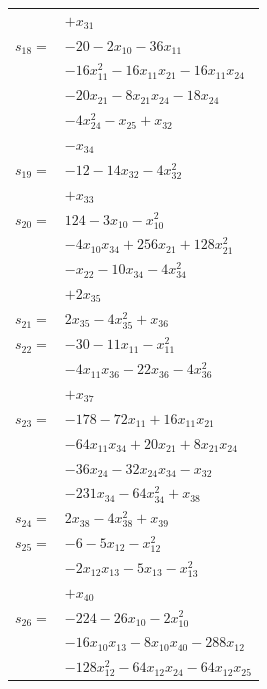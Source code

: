 \begin{longtable}{@{}r@{\;}l@{}}
 & \(\displaystyle +x_{31}\) \\[3pt]
\(s_{18}=\) & \(\displaystyle -20 -2x_{10} -36x_{11}\) \\
 & \(\displaystyle -16x_{11}^{2} -16x_{11}x_{21} -16x_{11}x_{24}\) \\
 & \(\displaystyle -20x_{21} -8x_{21}x_{24} -18x_{24}\) \\
 & \(\displaystyle -4x_{24}^{2} -x_{25} +x_{32}\) \\
 & \(\displaystyle -x_{34}\) \\[3pt]
\(s_{19}=\) & \(\displaystyle -12 -14x_{32} -4x_{32}^{2}\) \\
 & \(\displaystyle +x_{33}\) \\[3pt]
\(s_{20}=\) & \(\displaystyle 124 -3x_{10} -x_{10}^{2}\) \\
 & \(\displaystyle -4x_{10}x_{34} +256x_{21} +128x_{21}^{2}\) \\
 & \(\displaystyle -x_{22} -10x_{34} -4x_{34}^{2}\) \\
 & \(\displaystyle +2x_{35}\) \\[3pt]
\(s_{21}=\) & \(\displaystyle 2x_{35} -4x_{35}^{2} +x_{36}\) \\[3pt]
\(s_{22}=\) & \(\displaystyle -30 -11x_{11} -x_{11}^{2}\) \\
 & \(\displaystyle -4x_{11}x_{36} -22x_{36} -4x_{36}^{2}\) \\
 & \(\displaystyle +x_{37}\) \\[3pt]
\(s_{23}=\) & \(\displaystyle -178 -72x_{11} +16x_{11}x_{21}\) \\
 & \(\displaystyle -64x_{11}x_{34} +20x_{21} +8x_{21}x_{24}\) \\
 & \(\displaystyle -36x_{24} -32x_{24}x_{34} -x_{32}\) \\
 & \(\displaystyle -231x_{34} -64x_{34}^{2} +x_{38}\) \\[3pt]
\(s_{24}=\) & \(\displaystyle 2x_{38} -4x_{38}^{2} +x_{39}\) \\[3pt]
\(s_{25}=\) & \(\displaystyle -6 -5x_{12} -x_{12}^{2}\) \\
 & \(\displaystyle -2x_{12}x_{13} -5x_{13} -x_{13}^{2}\) \\
 & \(\displaystyle +x_{40}\) \\[3pt]
\(s_{26}=\) & \(\displaystyle -224 -26x_{10} -2x_{10}^{2}\) \\
 & \(\displaystyle -16x_{10}x_{13} -8x_{10}x_{40} -288x_{12}\) \\
 & \(\displaystyle -128x_{12}^{2} -64x_{12}x_{24} -64x_{12}x_{25}\) \\

\end{longtable}
